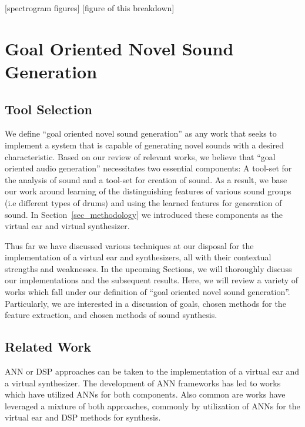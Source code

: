 \documentclass[runningheads,a4paper]{llncs}
\begin{document}
[spectrogram figures]
[figure of this breakdown]

\section{Goal Oriented Novel Sound Generation}

\label{related}
\subsection{Tool Selection}
We define \enquote{goal oriented novel sound generation} as any work that seeks to implement a system that is capable of generating novel sounds with a desired characteristic. Based on our review of relevant works, we believe that \enquote{goal oriented audio generation} necessitates two essential components: A tool-set for the analysis of sound and a tool-set for creation of sound. As a result, we base our work around learning of the distinguishing features of various sound groups (i.e different types of drums) and using the learned features for generation of sound. In Section~\ref{sec_methodology} we introduced these components as the virtual ear and virtual synthesizer. 

 Thus far we have discussed various techniques at our disposal for the implementation of a virtual ear and synthesizers, all with their contextual strengths and weaknesses. In the upcoming Sections, we will thoroughly discuss our implementations and the subsequent results. Here, we will review a variety of works which fall under our definition of \enquote{goal oriented novel sound generation}. Particularly, we are interested in a discussion of goals, chosen methods for the feature extraction, and chosen methods of sound synthesis. 

\subsection{Related Work}
ANN or DSP approaches can be taken to the implementation of a virtual ear and a virtual synthesizer. The development of ANN frameworks has led to works which have utilized ANNs for both components. Also common are works have leveraged a mixture of both approaches, commonly by utilization of ANNs for the virtual ear and DSP methods for synthesis.
\end{document}
